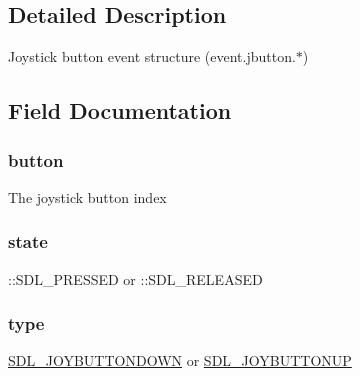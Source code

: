 \subsection{Detailed Description}
Joystick button event structure (event.\+jbutton.$\ast$) 

\subsection{Field Documentation}
\subsubsection[{\texorpdfstring{button}{button}}]{ button}\hypertarget{struct_s_d_l___joy_button_event_a63c1d3c03e676c0ea5864dc6d0b0082c}{}\label{struct_s_d_l___joy_button_event_a63c1d3c03e676c0ea5864dc6d0b0082c}
The joystick button index 
\subsubsection[{\texorpdfstring{state}{state}}]{ state}\hypertarget{struct_s_d_l___joy_button_event_a6b8d8e916bc56265a3fd279bd26b6d1b}{}\label{struct_s_d_l___joy_button_event_a6b8d8e916bc56265a3fd279bd26b6d1b}
\+::\+S\+D\+L\+\_\+\+P\+R\+E\+S\+S\+ED or \+::\+S\+D\+L\+\_\+\+R\+E\+L\+E\+A\+S\+ED 
\subsubsection[{\texorpdfstring{type}{type}}]{ type}\hypertarget{struct_s_d_l___joy_button_event_aa40a9b05c3154032b9f2d7220e9f08dc}{}\label{struct_s_d_l___joy_button_event_aa40a9b05c3154032b9f2d7220e9f08dc}
\hyperlink{_s_d_l__events_8h_a3b589e89be6b35c02e0dd34a55f3fccaa386ac978bc145a45883fe0adab70710b}{S\+D\+L\+\_\+\+J\+O\+Y\+B\+U\+T\+T\+O\+N\+D\+O\+WN} or \hyperlink{_s_d_l__events_8h_a3b589e89be6b35c02e0dd34a55f3fccaa76f91c81110f012e3a47cbbc0449e3c3}{S\+D\+L\+\_\+\+J\+O\+Y\+B\+U\+T\+T\+O\+N\+UP} 
